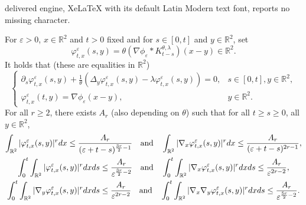 \documentclass[10pt,a4paper]{amsart}
\newcommand{\R}{\mathbb{R}}
\newcommand{\dd}{{\rm d}}
\newcommand{\e}{\varepsilon}
\begin{document}
delivered engine, XeLaTeX with its default Latin Modern text font, reports no missing character.
\begin{lemma}\label{tri} 
For $\e>0$, $x\in \R^2$ and $t>0$ fixed and for
$s\in [0,t]$ and $y\in \R^2$, set 
$$
\varphi^\e_{t,x}(s,y)=\theta(\nabla \phi_\e \ast K^{\theta,\lambda}_{t-s})(x-y)\in\R^2.
$$
It holds that (these are equalities in $\R^2$)
\begin{equation}\label{tri2}
\left\{\begin{array}{ll}
\partial_s \varphi^\e_{t,x}(s,y)+\frac1\theta(\Delta_y \varphi^\e_{t,x}(s,y) -\lambda 
\varphi^\e_{t,x}(s,y))=0, & s\in [0,t],y \in \R^2,\\[3pt]
\varphi^\e_{t,x}(t,y)=\nabla \phi_\e(x-y),&y \in \R^2.
\end{array}\right.
\end{equation}
For all $r\geq 2$, there exists $A_{r}$ (also depending on $\theta$)
such that for all $t\geq s \geq 0$, all $y\in \R^2$,
\begin{gather}
\int_{\R^2} |\varphi^\e_{t,x}(s,y)|^r \dd x \leq \frac{A_r}{(\e+t-s)^{\frac{3r}2-1}}
\quad \text{and} \quad 
\int_{\R^2} |\nabla_x\varphi^\e_{t,x}(s,y)|^r \dd x \leq \frac{A_r}{(\e+t-s)^{2r-1}},\label{estp0}\\
\int_0^t \int_{\R^2} |\varphi^\e_{t,x}(s,y)|^r \dd x \dd s \leq \frac{A_r}{\e^{\frac{3r}2-2}}
\quad \text{and} \quad 
\int_0^t \int_{\R^2} |\nabla_x\varphi^\e_{t,x}(s,y)|^r \dd x \dd s \leq \frac{A_r}{\e^{2r-2}},\label{estp1}\\
\int_0^t \int_{\R^2} |\nabla_y\varphi^\e_{t,x}(s,y)|^r \dd x \dd s \leq \frac{A_r}{\e^{2r-2}}
\quad \text{and} \quad 
\int_0^t \int_{\R^2} |\nabla_x\nabla_y\varphi^\e_{t,x}(s,y)|^r \dd x \dd s \leq \frac{A_r}{\e^{\frac{5r}2-2}}.
\label{estp2}
\end{gather}
\end{lemma}
\end{document}
